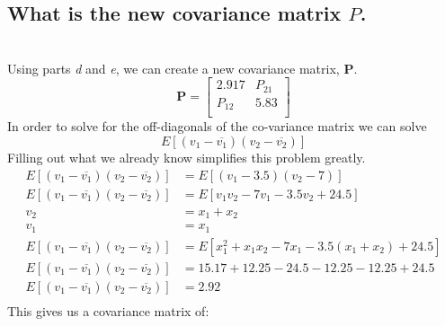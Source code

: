 \documentclass[12pt,letterpaper, onecolumn]{exam}
\begin{document}
\begin{questions}
\begin{parts}
            \part{What is the new covariance matrix $P$.}\\
                \solution
                    Using parts \textit{d} and \textit{e}, we can create a new covariance matrix, $\mathbf{P}$.
                    \begin{equation}
                        \mathbf{P} = 
                        \begin{bmatrix}
                            2.917 & P_{21} \\
                            P_{12} & 5.83 \\
                        \end{bmatrix}
                    \end{equation}
                    In order to solve for the off-diagonals of the co-variance matrix we can solve 
                    \[E\left[(v_1 - \overline{v_1})(v_2 - \overline{v_2}) \right] \]
                    Filling out what we already know simplifies this problem greatly.
                    \begin{equation}
                        \begin{split}
                            E\left[(v_1 - \overline{v_1})(v_2 - \overline{v_2}) \right] & = E\left[(v_1 - 3.5)(v_2 - 7) \right]\\
                            E\left[(v_1 - \overline{v_1})(v_2 - \overline{v_2}) \right] & = E\left[v_1v_2 - 7v_1 - 3.5v_2 + 24.5\right]\\
                            v_2 & = x_1 + x_2\\
                            v_1 & = x_1\\
                            E\left[(v_1 - \overline{v_1})(v_2 - \overline{v_2}) \right] & = E\left[x_1^2 + x_1x_2 - 7x_1 - 3.5(x_1 + x_2) + 24.5\right]\\
                            E\left[(v_1 - \overline{v_1})(v_2 - \overline{v_2}) \right] & = 15.17 + 12.25 - 24.5 - 12.25 - 12.25 + 24.5\\
                            E\left[(v_1 - \overline{v_1})(v_2 - \overline{v_2}) \right] & = 2.92\\
                        \end{split}
                    \end{equation}
                    This gives us a covariance matrix of:
                    \begin{equation}

\end{equation}
\end{parts}
\end{questions}
\end{document}
